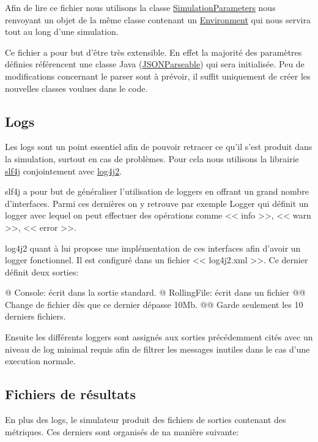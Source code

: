 \documentclass[final]{polytech/polytech}
\newcommand{\klass}[1]{\hyperref[class:#1]{#1}}
\begin{document}
			Afin de lire ce fichier nous utilisons la classe \klass{SimulationParameters} nous renvoyant un objet de la même classe contenant un \klass{Environment} qui nous servira tout au long d'une simulation.
			
			Ce fichier a pour but d'être très extensible.
			En effet la majorité des paramètres définies référencent une classe Java (\klass{JSONParseable}) qui sera initialisée.
			Peu de modifications concernant le parser sont à prévoir, il suffit uniquement de créer les nouvelles classes voulues dans le code.
			
		\subsection{Logs}
			Les logs sont un point essentiel afin de pouvoir retracer ce qu'il s'est produit dans la simulation, surtout en cas de problèmes.
			Pour cela nous utilisons la librairie \href{https://www.slf4j.org/}{slf4j} conjointement avec \href{https://logging.apache.org/log4j/2.x/}{log4j2}.
			
			slf4j a pour but de généraliser l'utilisation de loggers en offrant un grand nombre d'interfaces.
			Parmi ces dernières on y retrouve par exemple Logger qui définit un logger avec lequel on peut effectuer des opérations comme << info >>, << warn >>, << error >>.
			
			log4j2 quant à lui propose une implémentation de ces interfaces afin d'avoir un logger fonctionnel.
			Il est configuré dans un fichier << log4j2.xml >>.
			Ce dernier définit deux sorties:
			\begin{easylist}
				@ Console: écrit dans la sortie standard.
				@ RollingFile: écrit dans un fichier
				@@ Change de fichier dès que ce dernier dépasse 10Mb.
				@@ Garde seulement les 10 derniers fichiers.
			\end{easylist}
			
			Ensuite les différents loggers sont assignés aux sorties précédemment cités avec un niveau de log minimal requis afin de filtrer les messages inutiles dans le cas d'une execution normale.
		
		\subsection{Fichiers de résultats\label{sec:dev:metrics}}
			En plus des logs, le simulateur produit des fichiers de sorties contenant des métriques.
			Ces derniers sont organisés de na manière suivante:
			
\end{document}
